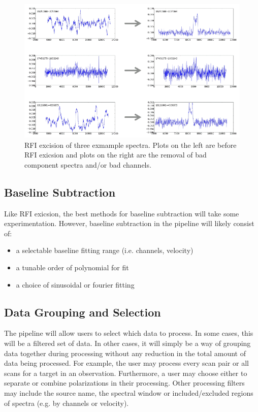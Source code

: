 \documentclass[11pt,twoside]{article}
\begin{document}
\begin{figure}[ht!]
\centering%
\includegraphics[width=5in]{P66_f1}
\caption{RFI excision of three exmample spectra.  Plots on the left are before RFI exicsion and plots on the right are the removal of bad component spectra and/or bad channels.}
\label{fig:RFIfigure}
\end{figure}

\subsection{Baseline Subtraction}

Like RFI exicsion, the best methods for baseline subtraction will take some experimentation.  However, baseline subtraction in the pipeline will likely consist of:

\begin{itemize}
\item a selectable baseline fitting range (i.e. channels, velocity)
\item a tunable order of polynomial for fit
\item a choice of sinusoidal or fourier fitting
\end{itemize}

\subsection{Data Grouping and Selection}

The pipeline will allow users to select which data to process.  In some cases, this will be a filtered set of data.  In other cases, it will simply be a way of grouping data together during processing without any reduction in the total amount of data being processed.  For example, the user may process every scan pair or all scans for a target in an observation.  Furthermore, a user may choose either to separate or combine polarizations in their processing.  Other processing filters may include the source name, the spectral window or included/excluded regions of spectra (e.g. by channels or velocity).
\end{document}

